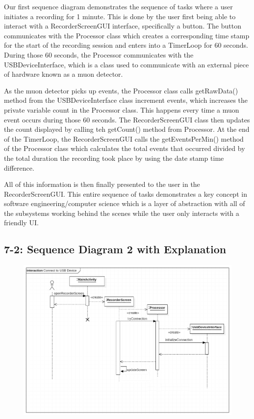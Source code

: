 \documentclass[11pt,a4paper]{article}
\begin{document}
Our first sequence diagram demonstrates the sequence of tasks where a user initiates a recording for 1 minute. This is done by the user first being able to interact with a RecorderScreenGUI interface, specifically a button. The button communicates with the Processor class which creates a corresponding time stamp for the start of the recording session and enters into a TimerLoop for 60 seconds. During those 60 seconds, the Processor communicates with the USBDeviceInterface, which is a class used to communicate with an external piece of hardware known as a muon detector. 

As the muon detector picks up events, the Processor class calls getRawData() method from the USBDeviceInterface class increment events, which increases the private variable count in the Processor class. This happens every time a muon event occurs during those 60 seconds. The RecorderScreenGUI class then updates the count displayed by calling teh getCount() method from Processor. At the end of the TimerLoop, the RecorderScreenGUI calls the getEventsPerMin() method of the Processor class which calculates the total events that occurred divided by the total duration the recording took place by using the date stamp time difference. 

All of this information is then finally presented to the user in the RecorderScreenGUI. This entire sequence of tasks demonstrates a key concept in software engineering/computer science which is a layer of abstraction with all of the subsystems working behind the scenes while the user only interacts with a friendly UI. 

\newpage
\subsection*{7-2: Sequence Diagram 2 with Explanation}

\begin{figure}[h] \hspace{-2cm}
	\includegraphics[width=1.3\textwidth]{sequence2.png}
\end{figure}
\end{document}
